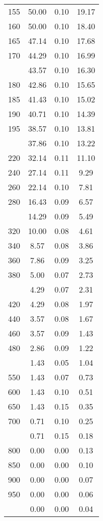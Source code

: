 \begin{table}[ht]
\begin{tabular}{lccc}
  155 & 50.00 & 0.10 & 19.17 \\ 
  160 & 50.00 & 0.10 & 18.40 \\ 
  165 & 47.14 & 0.10 & 17.68 \\ 
  170 & 44.29 & 0.10 & 16.99 \\ 
   \addlinespace
175 & 43.57 & 0.10 & 16.30 \\ 
  180 & 42.86 & 0.10 & 15.65 \\ 
  185 & 41.43 & 0.10 & 15.02 \\ 
  190 & 40.71 & 0.10 & 14.39 \\ 
  195 & 38.57 & 0.10 & 13.81 \\ 
   \addlinespace
200 & 37.86 & 0.10 & 13.22 \\ 
  220 & 32.14 & 0.11 & 11.10 \\ 
  240 & 27.14 & 0.11 & 9.29 \\ 
  260 & 22.14 & 0.10 & 7.81 \\ 
  280 & 16.43 & 0.09 & 6.57 \\ 
   \addlinespace
300 & 14.29 & 0.09 & 5.49 \\ 
  320 & 10.00 & 0.08 & 4.61 \\ 
  340 & 8.57 & 0.08 & 3.86 \\ 
  360 & 7.86 & 0.09 & 3.25 \\ 
  380 & 5.00 & 0.07 & 2.73 \\ 
   \addlinespace
400 & 4.29 & 0.07 & 2.31 \\ 
  420 & 4.29 & 0.08 & 1.97 \\ 
  440 & 3.57 & 0.08 & 1.67 \\ 
  460 & 3.57 & 0.09 & 1.43 \\ 
  480 & 2.86 & 0.09 & 1.22 \\ 
   \addlinespace
500 & 1.43 & 0.05 & 1.04 \\ 
  550 & 1.43 & 0.07 & 0.73 \\ 
  600 & 1.43 & 0.10 & 0.51 \\ 
  650 & 1.43 & 0.15 & 0.35 \\ 
  700 & 0.71 & 0.10 & 0.25 \\ 
   \addlinespace
750 & 0.71 & 0.15 & 0.18 \\ 
  800 & 0.00 & 0.00 & 0.13 \\ 
  850 & 0.00 & 0.00 & 0.10 \\ 
  900 & 0.00 & 0.00 & 0.07 \\ 
  950 & 0.00 & 0.00 & 0.06 \\ 
   \addlinespace
1000 & 0.00 & 0.00 & 0.04 \\ 
   \bottomrule
\end{tabular}
\end{table}
